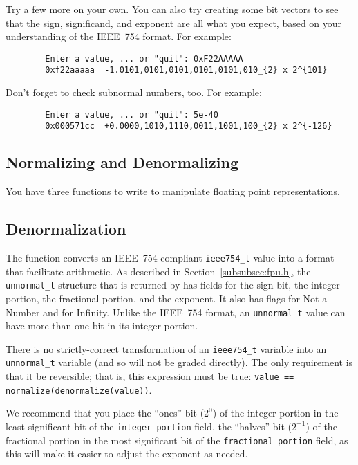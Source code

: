     Try a few more on your own.
    You can also try creating some bit vectors to see that the sign, significand, and exponent are all what you expect, based on your understanding of the IEEE~754 format.
    For example:

    \begin{verbatim}
        Enter a value, ... or "quit": 0xF22AAAAA
        0xf22aaaaa	-1.0101,0101,0101,0101,0101,010_{2} x 2^{101}
    \end{verbatim}

    Don't forget to check subnormal numbers, too.
    For example:

    \begin{verbatim}
        Enter a value, ... or "quit": 5e-40
        0x000571cc	+0.0000,1010,1110,0011,1001,100_{2} x 2^{-126}
    \end{verbatim}

    \subsection*{Normalizing and Denormalizing}

    You have three functions to write to manipulate floating point representations.

    \subsection{Denormalization}

    The  function converts an IEEE~754-compliant \lstinline{ieee754_t} value into a format that facilitate arithmetic.
    As described in Section~\ref{subsubsec:fpu.h}, the \lstinline{unnormal_t} structure that is returned by  has fields for the sign bit, the integer portion, the fractional portion, and the exponent.
    It also has flags for Not-a-Number and for Infinity.
    Unlike the IEEE~754 format, an \lstinline{unnormal_t} value can have more than one bit in its integer portion.

    There is no strictly-correct transformation of an \lstinline{ieee754_t} variable into an \lstinline{unnormal_t} variable (and so  will not be graded directly).
    The only requirement is that it be reversible;
    that is, this expression must be true: \lstinline{value == normalize(denormalize(value))}.

    We recommend that you place the ``ones'' bit ($2^0$) of the integer portion in the least significant bit of the \lstinline{integer_portion} field, the ``halves'' bit ($2^{-1}$) of the fractional portion in the most significant bit of the \lstinline{fractional_portion} field, as this will make it easier to adjust the exponent as needed.

